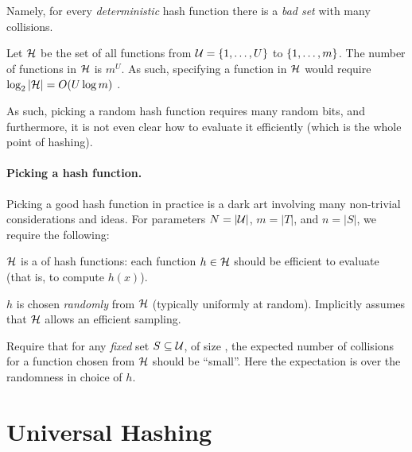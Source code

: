 Namely, for every \emph{deterministic} hash function there is a \emph{bad set} with many
collisions.

\begin{observation}
    Let $\mathcal{H}$ be the set of all functions from
    $\mathcal{U} = \left\{ {1,\ldots, U} \right\}$  to $\left\{ {1, \ldots, m} \right\}$. The number of
    functions in $\mathcal{H}$ is $m^U$. As such, specifying a function in
    $\mathcal{H}$ would require $\log_2 \left| {\mathcal{H}} \right| = O(U \log m)$ .
\end{observation}

As such, picking a  random hash function requires many random
bits, and furthermore, it is not even clear how to evaluate it
efficiently (which is the whole point of hashing).



\paragraph*{Picking a hash function.}
Picking a good hash function in practice is a dark art involving many
non-trivial considerations and ideas. For parameters $N = |\mathcal{U}|$,
$m = |T|$, and $n = |S|$, we require the following:
\begin{compactenumA}
    \item $\mathcal{H}$ is a  of hash functions: each function
    $h \in \mathcal{H}$ should be efficient to evaluate (that is, to compute
    $h(x)$).
    
    \item $h$ is chosen \emph{randomly} from $\mathcal{H}$ (typically
    uniformly at random). Implicitly assumes that $\mathcal{H}$ allows an
    efficient sampling.
    
    \item Require that for any {\em fixed} set $S \subseteq \mathcal{U}$, of
    size , the expected number of collisions for a function chosen
    from $\mathcal{H}$ should be ``small''. Here the expectation is over the
    randomness in choice of $h$.
\end{compactenumA}




\section{Universal Hashing}

